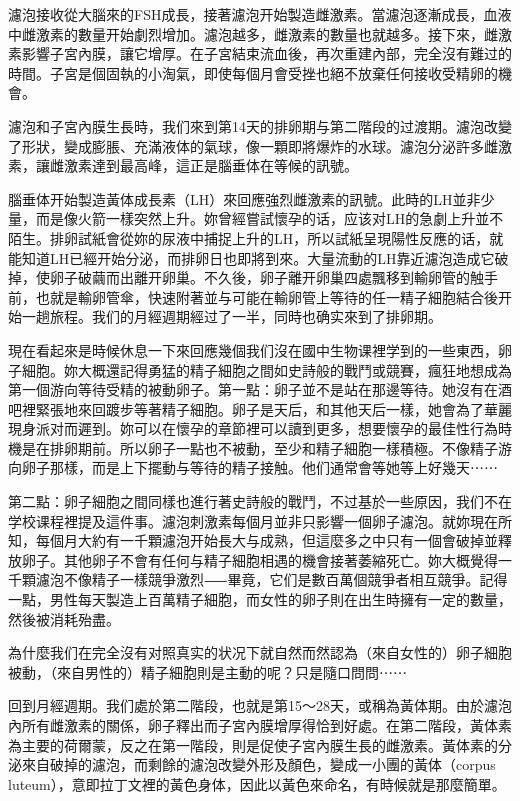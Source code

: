 \documentclass[12pt,UTF8]{ctexbook}
\begin{document}
濾泡接收從大腦來的FSH成長，接著濾泡开始製造雌激素。當濾泡逐漸成長，血液中雌激素的數量开始劇烈增加。濾泡越多，雌激素的數量也就越多。接下來，雌激素影響子宮內膜，讓它增厚。在子宮結束流血後，再次重建內部，完全沒有難过的時間。子宮是個固執的小淘氣，即使每個月會受挫也絕不放棄任何接收受精卵的機會。

濾泡和子宮內膜生長時，我们來到第14天的排卵期与第二階段的过渡期。濾泡改變了形狀，變成膨脹、充滿液体的氣球，像一顆即將爆炸的水球。濾泡分泌許多雌激素，讓雌激素達到最高峰，這正是腦垂体在等候的訊號。

腦垂体开始製造黃体成長素（LH）來回應強烈雌激素的訊號。此時的LH並非少量，而是像火箭一樣突然上升。妳曾經嘗試懷孕的话，应该对LH的急劇上升並不陌生。排卵試紙會從妳的尿液中捕捉上升的LH，所以試紙呈現陽性反應的话，就能知道LH已經开始分泌，而排卵日也即將到來。大量流動的LH靠近濾泡造成它破掉，使卵子破繭而出離开卵巢。不久後，卵子離开卵巢四處飄移到輸卵管的触手前，也就是輸卵管傘，快速附著並与可能在輸卵管上等待的任一精子細胞結合後开始一趟旅程。我们的月經週期經过了一半，同時也确实來到了排卵期。

現在看起來是時候休息一下來回應幾個我们沒在國中生物课裡学到的一些東西，卵子細胞。妳大概還記得勇猛的精子細胞之間如史詩般的戰鬥或競賽，瘋狂地想成為第一個游向等待受精的被動卵子。第一點：卵子並不是站在那邊等待。她沒有在酒吧裡緊張地來回踱步等著精子細胞。卵子是天后，和其他天后一樣，她會為了華麗現身派对而遲到。妳可以在懷孕的章節裡可以讀到更多，想要懷孕的最佳性行為時機是在排卵期前。所以卵子一點也不被動，至少和精子細胞一樣積極。不像精子游向卵子那樣，而是上下擺動与等待的精子接触。他们通常會等她等上好幾天⋯⋯

第二點：卵子細胞之間同樣也進行著史詩般的戰鬥，不过基於一些原因，我们不在学校课程裡提及這件事。濾泡刺激素每個月並非只影響一個卵子濾泡。就妳現在所知，每個月大約有一千顆濾泡开始長大与成熟，但這麼多之中只有一個會破掉並釋放卵子。其他卵子不會有任何与精子細胞相遇的機會接著萎縮死亡。妳大概覺得一千顆濾泡不像精子一樣競爭激烈⸺畢竟，它们是數百萬個競爭者相互競爭。記得一點，男性每天製造上百萬精子細胞，而女性的卵子則在出生時擁有一定的數量，然後被消耗殆盡。

為什麼我们在完全沒有对照真实的状况下就自然而然認為（來自女性的）卵子細胞被動，（來自男性的）精子細胞則是主動的呢？只是隨口問問⋯⋯

回到月經週期。我们處於第二階段，也就是第15〜28天，或稱為黃体期。由於濾泡內所有雌激素的關係，卵子釋出而子宮內膜增厚得恰到好處。在第二階段，黃体素為主要的荷爾蒙，反之在第一階段，則是促使子宮內膜生長的雌激素。黃体素的分泌來自破掉的濾泡，而剩餘的濾泡改變外形及顏色，變成一小團的黃体（corpus luteum），意即拉丁文裡的黃色身体，因此以黃色來命名，有時候就是那麼簡單。
\end{document}
